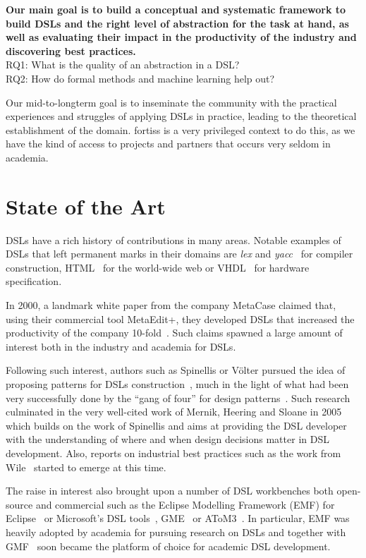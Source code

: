 \documentclass{article}
\begin{document}
\textbf{Our main goal is to build a conceptual and systematic framework to build
DSLs and the right level of abstraction for the task at hand, as well as
evaluating their impact in the productivity of the industry and
discovering best practices.}\\

RQ1: What is the quality of an abstraction in a DSL?\\ 
RQ2: How do formal methods and machine learning help out?

Our mid-to-longterm goal is to inseminate the community with the practical
experiences and struggles of applying DSLs in practice, leading to the
theoretical establishment of the domain. fortiss is a very privileged context to
do this, as we have the kind of access to projects and partners that occurs very
seldom in academia.
 
\section{State of the Art}

DSLs have a rich history of contributions in many areas. Notable examples of
DSLs that left permanent marks in their domains are \emph{lex} and
\emph{yacc}~\cite{Johnson80} for compiler construction, HTML~\cite{BernersLee96}
for the world-wide web or VHDL~\cite{Ashenden02} for hardware specification.

In 2000, a landmark white paper from the company MetaCase
claimed that, using their commercial tool MetaEdit+, they developed DSLs that 
increased the productivity of the company 10-fold~\cite{metacase00}. Such claims
spawned a large amount of interest both in the industry and academia for DSLs.

Following such interest, authors such as Spinellis or V\"olter pursued the idea
of proposing patterns for DSLs construction~\cite{Spinellis01,VolterB04}, much
in the light of what had been very successfully done by the ``gang of four'' for
design patterns~\cite{Gamma:95}. Such research culminated in the very well-cited
work of Mernik, Heering and Sloane in 2005~\cite{MernikHS05} which builds on
the work of Spinellis and aims at providing the DSL developer with the
understanding of where and when design decisions matter in DSL development.
Also, reports on industrial best practices such as the work from
Wile~\cite{Wile03} started to emerge at this time.

The raise in interest also brought upon a number of DSL workbenches both
open-source and commercial such as the Eclipse Modelling Framework
(EMF) for Eclipse~\cite{emf} or Microsoft's DSL tools~\cite{microsoftDSLTools},
GME~\cite{gme} or AToM3~\cite{atom3}. In particular, EMF was heavily adopted by
academia for pursuing research on DSLs and together with GMF~\cite{gmf} soon
became the platform of choice for academic DSL development.
 
\end{document}
